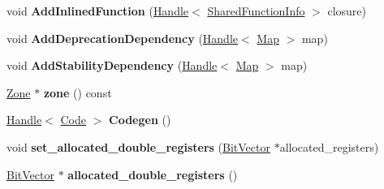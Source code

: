 \begin{DoxyCompactItemize}
\item 
void {\bfseries Add\+Inlined\+Function} (\hyperlink{classv8_1_1internal_1_1_handle}{Handle}$<$ \hyperlink{classv8_1_1internal_1_1_shared_function_info}{Shared\+Function\+Info} $>$ closure)\hypertarget{classv8_1_1internal_1_1_l_chunk_ab7db7b03e38df1cf47274ea5d4a1e161}{}\label{classv8_1_1internal_1_1_l_chunk_ab7db7b03e38df1cf47274ea5d4a1e161}

\item 
void {\bfseries Add\+Deprecation\+Dependency} (\hyperlink{classv8_1_1internal_1_1_handle}{Handle}$<$ \hyperlink{classv8_1_1internal_1_1_map}{Map} $>$ map)\hypertarget{classv8_1_1internal_1_1_l_chunk_a5fd4cf48b99c790a25bfd62087e2e9cc}{}\label{classv8_1_1internal_1_1_l_chunk_a5fd4cf48b99c790a25bfd62087e2e9cc}

\item 
void {\bfseries Add\+Stability\+Dependency} (\hyperlink{classv8_1_1internal_1_1_handle}{Handle}$<$ \hyperlink{classv8_1_1internal_1_1_map}{Map} $>$ map)\hypertarget{classv8_1_1internal_1_1_l_chunk_acdabbd4b6e6b4921ab3634fb2379523d}{}\label{classv8_1_1internal_1_1_l_chunk_acdabbd4b6e6b4921ab3634fb2379523d}

\item 
\hyperlink{classv8_1_1internal_1_1_zone}{Zone} $\ast$ {\bfseries zone} () const \hypertarget{classv8_1_1internal_1_1_l_chunk_a06b554199ad9b7d54036e5079fff6d94}{}\label{classv8_1_1internal_1_1_l_chunk_a06b554199ad9b7d54036e5079fff6d94}

\item 
\hyperlink{classv8_1_1internal_1_1_handle}{Handle}$<$ \hyperlink{classv8_1_1internal_1_1_code}{Code} $>$ {\bfseries Codegen} ()\hypertarget{classv8_1_1internal_1_1_l_chunk_a5f0cd642edcb086e6db8d4c84ded744a}{}\label{classv8_1_1internal_1_1_l_chunk_a5f0cd642edcb086e6db8d4c84ded744a}

\item 
void {\bfseries set\+\_\+allocated\+\_\+double\+\_\+registers} (\hyperlink{classv8_1_1internal_1_1_bit_vector}{Bit\+Vector} $\ast$allocated\+\_\+registers)\hypertarget{classv8_1_1internal_1_1_l_chunk_a2299aec2d106b0c882670f5191df4404}{}\label{classv8_1_1internal_1_1_l_chunk_a2299aec2d106b0c882670f5191df4404}

\item 
\hyperlink{classv8_1_1internal_1_1_bit_vector}{Bit\+Vector} $\ast$ {\bfseries allocated\+\_\+double\+\_\+registers} ()\hypertarget{classv8_1_1internal_1_1_l_chunk_a31588083d702b377696de3ac69e92243}{}\label{classv8_1_1internal_1_1_l_chunk_a31588083d702b377696de3ac69e92243}

\end{DoxyCompactItemize}
